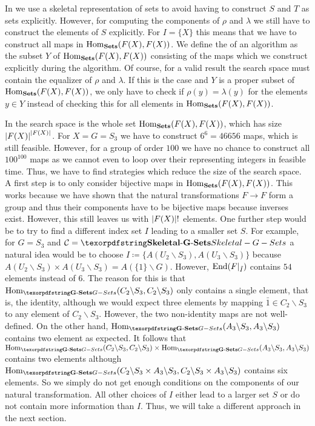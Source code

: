 \begin{rem}
In  we use a skeletal representation of sets to avoid having to construct $S$ and $T$ as sets explicitly. However, for computing the components of $\rho$ and $\lambda$ we still have to construct the elements of $S$ explicitly. For $I = \{X\}$ this means that we have to construct all maps in $\operatorname{Hom}_{{\operatorname{\mathbf{Sets}}}}(F(X),F(X))$. We define the  of an algorithm as the subset $Y$ of $\operatorname{Hom}_{{\operatorname{\mathbf{Sets}}}}(F(X),F(X))$ consisting of the maps which we construct explicitly during the algorithm. Of course, for a valid result the search space must contain the equalizer of $\rho$ and $\lambda$. If this is the case and $Y$ is a proper subset of $\operatorname{Hom}_{{\operatorname{\mathbf{Sets}}}}(F(X),F(X))$, we only have to check if $\rho(y) = \lambda(y)$ for the elements $y \in Y$ instead of checking this for all elements in $\operatorname{Hom}_{{\operatorname{\mathbf{Sets}}}}(F(X),F(X))$.

In  the search space is the whole set $\operatorname{Hom}_{{\operatorname{\mathbf{Sets}}}}(F(X),F(X))$, which has size ${\lvert F(X)\rvert}^{\lvert F(X)\rvert}$. For $X = G = S_3$ we have to construct $6^6 = 46656$ maps, which is still feasible. However, for a group of order $100$ we have no chance to construct all $100^{100}$ maps as we cannot even to loop over their representing integers in feasible time. Thus, we have to find strategies which reduce the size of the search space. A first step is to only consider bijective maps in $\operatorname{Hom}_{{\operatorname{\mathbf{Sets}}}}(F(X),F(X))$. This works because we have shown that the natural transformations $F \to F$ form a group and thus their components have to be bijective maps because inverses exist. However, this still leaves us with ${\lvert F(X)\rvert}!$ elements. One further step would be to try to find a different index set $I$ leading to a smaller set $S$. For example, for $G = S_3$ and $\Ccal = \SkeletalGSets$ a natural idea would be to choose $I \coloneqq \{A(U_2 \backslash S_3),A(U_3 \backslash S_3)\}$ because $A(U_2 \backslash S_3) \times A(U_3 \backslash S_3) = A(\{1\} \backslash G)$. However, $\operatorname{End}(F\vert_{\tilde I})$ contains $54$ elements instead of $6$. The reason for this is that $\Hom_\Gset(C_2 \backslash S_3 , C_2 \backslash S_3 )$ only contains a single element, that is, the identity, although we would expect three elements by mapping $\bar 1 \in C_2 \backslash S_3$ to any element of $C_2 \backslash S_3$. However, the two non-identity maps are not well-defined. On the other hand, $\Hom_\Gset( A_3 \backslash S_3 , A_3 \backslash S_3 )$  contains two element as expected. It follows that $\Hom_\Gset( C_2 \backslash S_3 , C_2 \backslash S_3 ) \times \Hom_\Gset( A_3 \backslash S_3 , A_3 \backslash S_3 )$ contains two elements although $\Hom_\Gset( C_2 \backslash S_3 \times A_3 \backslash S_3 , C_2 \backslash S_3 \times A_3 \backslash S_3 )$ contains six elements. So we simply do not get enough conditions on the components of our natural transformation. All other choices of $I$ either lead to a larger set $S$ or do not contain more information than $I$. Thus, we will take a different approach in the next section.
\end{rem}

